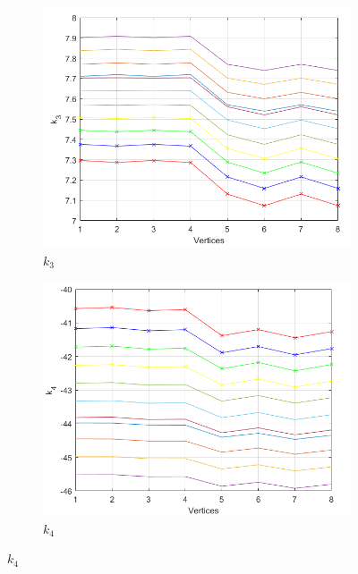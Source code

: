 \documentclass[a4paper,10pt]{article}
\begin{document}
\begin{figure}
	\centering
	\begin{subfigure}[b]{0.3\textwidth}
		\centering
		\includegraphics[scale=0.7]{fig/pdcmuk3}
		\caption{$k_3$}
	\end{subfigure}
	\hfill
	\begin{subfigure}[b]{0.45\textwidth}
		\centering
		\includegraphics[scale=0.7]{fig/pdcmuk4}
		\caption{$k_4$}
	\end{subfigure}
\end{figure}
\end{document}
